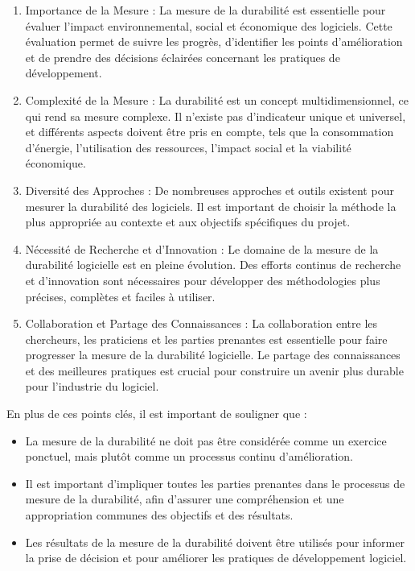 \begin{enumerate}
    \item Importance de la Mesure : La mesure de la durabilité est essentielle pour évaluer l'impact environnemental, social et économique des logiciels. Cette évaluation permet de suivre les progrès, d'identifier les points d'amélioration et de prendre des décisions éclairées concernant les pratiques de développement.
    \item Complexité de la Mesure : La durabilité est un concept multidimensionnel, ce qui rend sa mesure complexe. Il n'existe pas d'indicateur unique et universel, et différents aspects doivent être pris en compte, tels que la consommation d'énergie, l'utilisation des ressources, l'impact social et la viabilité économique.
    \item Diversité des Approches : De nombreuses approches et outils existent pour mesurer la durabilité des logiciels. Il est important de choisir la méthode la plus appropriée au contexte et aux objectifs spécifiques du projet.
    \item Nécessité de Recherche et d'Innovation : Le domaine de la mesure de la durabilité logicielle est en pleine évolution. Des efforts continus de recherche et d'innovation sont nécessaires pour développer des méthodologies plus précises, complètes et faciles à utiliser.
    \item Collaboration et Partage des Connaissances : La collaboration entre les chercheurs, les praticiens et les parties prenantes est essentielle pour faire progresser la mesure de la durabilité logicielle. Le partage des connaissances et des meilleures pratiques est crucial pour construire un avenir plus durable pour l'industrie du logiciel.
\end{enumerate}

En plus de ces points clés, il est important de souligner que :

\begin{itemize}
    \item La mesure de la durabilité ne doit pas être considérée comme un exercice ponctuel, mais plutôt comme un processus continu d'amélioration.
    \item Il est important d'impliquer toutes les parties prenantes dans le processus de mesure de la durabilité, afin d'assurer une compréhension et une appropriation communes des objectifs et des résultats.
    \item Les résultats de la mesure de la durabilité doivent être utilisés pour informer la prise de décision et pour améliorer les pratiques de développement logiciel.
\end{itemize}


